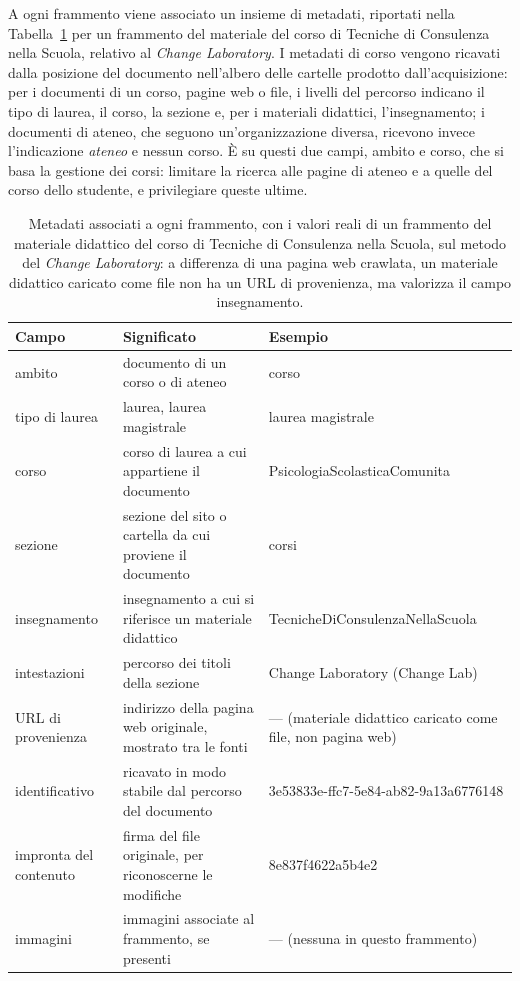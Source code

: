 A ogni frammento viene associato un insieme di metadati, riportati nella Tabella~\ref{tab:metadati} per un
frammento del materiale del corso di Tecniche di Consulenza nella Scuola, relativo al \emph{Change Laboratory}. I
metadati di corso vengono ricavati dalla posizione del documento nell'albero delle cartelle prodotto
dall'acquisizione: per i documenti di un corso, pagine web o file, i livelli del percorso indicano il tipo di
laurea, il corso, la sezione e, per i materiali didattici, l'insegnamento; i documenti di ateneo, che seguono
un'organizzazione diversa, ricevono invece l'indicazione \emph{ateneo} e nessun corso. È su questi due campi, ambito
e corso, che si basa la gestione dei corsi: limitare la ricerca alle
pagine di ateneo e a quelle del corso dello studente, e privilegiare queste ultime.

\begin{table}[H]
  \centering
  \small
  \begin{tabularx}{\textwidth}{@{} l >{\raggedright\arraybackslash}X >{\raggedright\arraybackslash}X @{}}
    \toprule
    \textbf{Campo} & \textbf{Significato} & \textbf{Esempio} \\
    \midrule
    ambito & documento di un corso o di ateneo & corso \\
    tipo di laurea & laurea, laurea magistrale & laurea magistrale \\
    corso & corso di laurea a cui appartiene il documento & PsicologiaScolasticaComunita \\
    sezione & sezione del sito o cartella da cui proviene il documento & corsi \\
    insegnamento & insegnamento a cui si riferisce un materiale didattico & TecnicheDiConsulenzaNellaScuola \\
    intestazioni & percorso dei titoli della sezione & Change Laboratory (Change Lab) \\
    URL di provenienza & indirizzo della pagina web originale, mostrato tra le fonti &
      --- (materiale didattico caricato come file, non pagina web) \\
    identificativo & ricavato in modo stabile dal percorso del documento & 3e53833e-ffc7-5e84-ab82-9a13a6776148 \\
    impronta del contenuto & firma del file originale, per riconoscerne le modifiche & 8e837f4622a5b4e2 \\
    immagini & immagini associate al frammento, se presenti & --- (nessuna in questo frammento) \\
    \bottomrule
  \end{tabularx}
  \caption{Metadati associati a ogni frammento, con i valori reali di un frammento del materiale didattico del corso
  di Tecniche di Consulenza nella Scuola, sul metodo del \emph{Change Laboratory}: a differenza di una pagina web
  crawlata, un materiale didattico caricato come file non ha un URL di provenienza, ma valorizza il campo
  insegnamento.}
  \label{tab:metadati}
\end{table}

